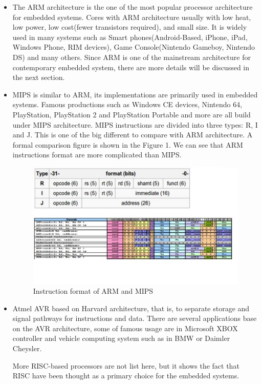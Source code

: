 \documentclass[conference]{IEEEtran}
\begin{document}
\begin{itemize} 
\item{The ARM architecture is the one of the most popular processor architecture for embedded systems. Cores with ARM architecture usually with low heat, low power, low cost(fewer transistors required), and small size. It is widely used in many systems such as Smart phones(Android-Based, iPhone, iPad, Windows Phone, RIM devices), Game Console(Nintendo Gameboy, Nintendo DS) and many others. Since ARM is one of the mainstream architecture for contemporary embedded system, there are more details will be discussed in the next section. }

\item{MIPS is similar to ARM, its implementations are primarily used in embedded systems. Famous productions such as Windows CE devices, Nintendo 64, PlayStation, PlayStation 2 and PlayStation Portable and more are all build under MIPS architecture. MIPS instructions are divided into three types: R, I and J. This is one of the big different to compare with ARM architecture. A formal comparison figure is shown in the Figure 1. We can see that ARM instructions format are more complicated than MIPS.}
\begin{figure}[h]
  \includegraphics[width=\linewidth]{ARMMIPS.jpg}
  \caption{Instruction format of ARM and MIPS}
  \label{fig:AM}
\end{figure}

 
\item{Atmel AVR based on Harvard architecture, that is, to separate storage and signal pathways for instructions and data. There are several applications base on the AVR architecture, some of famous usage are in Microsoft XBOX controller and vehicle computing system such as in BMW or Daimler Cheysler. }

More RISC-based processors are not list here, but it shows the fact that RISC have been thought as a primary choice for the embedded systems.

\end{itemize}
\end{document}
